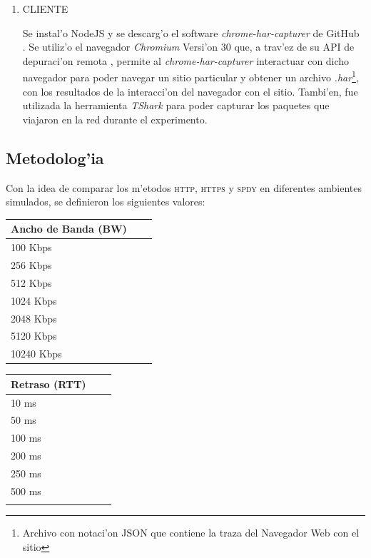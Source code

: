 \documentclass[a4paper,11pt,twocolumn]{article}
\begin{document}
\begin{enumerate}
\begin{quote}
gateway\_enable=''YES''
\end{quote}

Se configur'o el siguiente flag:
\begin{quote}\small
sysctl net.inet.ip.forwarding=1
\end{quote}
Y por 'ultimo, para que la Dummynet inicie junto con el Kernel del BSD se agreg'o la siguiente l'inea en el archivo \emph{''/bot/loader.conf''}
\begin{quote}\small
dummynet\_load=''YES''
\end{quote}
\item CLIENTE

Se instal'o NodeJS \cite{nodeJS} y se descarg'o el software \emph{chrome-har-capturer} \cite{harCapt} de GitHub \cite{github}.
Se utiliz'o el navegador \emph{Chromium} Versi'on 30 que, a trav'ez de su API de depuraci'on remota \cite{debuggingChrome}, permite al \emph{chrome-har-capturer} interactuar con dicho navegador para poder navegar un sitio particular y obtener un archivo \emph{.har}\footnote{Archivo con notaci'on JSON \cite{json} que contiene la traza del Navegador Web con el sitio}, con los resultados de la interacci'on del navegador con el sitio. Tambi'en, fue utilizada la herramienta \emph{TShark}\cite{tshark} para poder capturar los paquetes que viajaron en la red durante el experimento.

\end{enumerate} 

\subsection{Metodolog'ia}
 \label{exp1meto}
Con la idea de comparar los m'etodos \textsc{http}, \textsc{https} y \textsc{spdy} en diferentes ambientes simulados, se definieron los siguientes valores:

\vspace*{1\baselineskip}
\begin{tabular}{ l c r }
	Ancho de Banda (BW)  \\ \hline
  	100 Kbps \\
	256 Kbps \\
	512 Kbps \\
	1024 Kbps \\
	2048 Kbps \\
	5120 Kbps \\
	10240 Kbps \\
\end{tabular}
\vspace*{1\baselineskip}
\begin{tabular}{ l c r }
	Retraso (RTT) \\ \hline
  	10 ms \\
	50 ms \\
	100 ms \\
	200 ms \\
	250 ms \\
	500 ms \\
	\\
\end{tabular}
\end{document}
